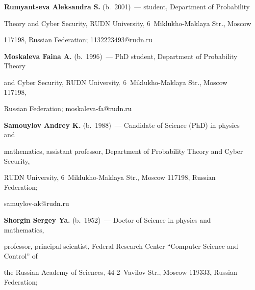 \vspace*{-12pt} 



\Contr



\vspace*{-6pt}



\noindent

\textbf{Rumyantseva Aleksandra S.} (b.\ 2001)~--- student, Department of Probability 

Theory and Cyber Security, RUDN University, 6~Miklukho-Maklaya Str., Moscow 

117198, Russian Federation; \mbox{1132223493@rudn.ru}



\vspace*{3pt}



\noindent

\textbf{Moskaleva Faina A.} (b.\ 1996)~--- PhD student, Department of Probability Theory 

and Cyber Security, RUDN University, 6~Miklukho-Maklaya Str., Moscow 117198, 

Russian Federation; \mbox{moskaleva-fa@rudn.ru}



\vspace*{3pt}






\noindent

\textbf{Samouylov Andrey K.} (b.\ 1988)~--- Candidate of Science (PhD) in physics and 

mathematics, assistant professor, Department of Probability Theory and Cyber Security, 

RUDN University, 6~Miklukho-Maklaya Str., Moscow 117198, Russian Federation; 

\mbox{samuylov-ak@rudn.ru}



\vspace*{3pt}



\noindent

\textbf{Shorgin Sergey Ya.} (b.\ 1952)~--- Doctor of Science in physics and mathematics, 

professor, principal scientist, Federal Research Center ``Computer Science and Control'' of 

the Russian Academy of Sciences, 44-2~Vavilov Str., Moscow 119333, Russian Federation; 

